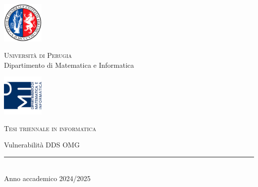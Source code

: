 \thispagestyle{empty} %

	\noindent %
	\includegraphics[width=0.15\textwidth]{img/logoUniPg}
	\begin{minipage}[b]{0.7\textwidth}
		\centering
		{\Large \textcolor{blu_dmi}{\textsc{Universit{\`a} di Perugia}}}\\
		\vspace{0.4 em}
		{\large \textcolor{blu_dmi}{Dipartimento di Matematica e Informatica}}
		\vspace{0.6 em}
	\end{minipage}%
	\includegraphics[width=0.15\textwidth]{img/logoDMI}
	
	\vspace{5 em}

	\begin{center}
		
		{\large \textcolor{blu_dmi}{\textsc{Tesi triennale in informatica}}}
		\vspace{8 em}
		
		{\Huge \textcolor{blu_dmi}{Vulnerabilità DDS OMG}}
		\vspace{10 em}
		
		
		\vspace{6 em}
		\vfill
		
		\textcolor{blu_dmi}{\rule{380pt}{.4pt}}\\
		\vspace{1.2 em}
		\large{\textcolor{blu_dmi}{Anno accademico 2024/2025}}
		
		
		
		
	\end{center}

